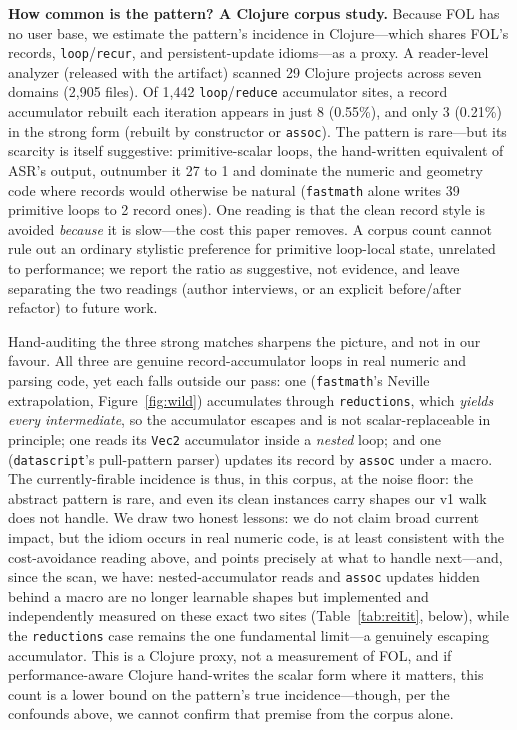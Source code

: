 \documentclass[sigplan,screen,review,anonymous]{acmart}
\begin{document}
\textbf{How common is the pattern? A Clojure corpus study.} Because FOL has no
user base, we estimate the pattern's incidence in Clojure---which shares FOL's
records, \texttt{loop}/\texttt{recur}, and persistent-update idioms---as a proxy.
A reader-level analyzer (released with the artifact) scanned 29 Clojure projects
across seven domains (2{,}905 files). Of 1{,}442 \texttt{loop}/\texttt{reduce}
accumulator sites, a record accumulator rebuilt each iteration appears in just 8
(0.55\%), and only 3 (0.21\%) in the strong form (rebuilt by constructor or
\texttt{assoc}). The pattern is rare---but its scarcity is itself suggestive:
primitive-scalar loops, the hand-written equivalent of ASR's output, outnumber it
27 to 1 and dominate the numeric and geometry code where records would
otherwise be natural (\texttt{fastmath} alone writes 39 primitive loops to 2
record ones). One reading is that the clean record style is avoided
\emph{because} it is slow---the cost this paper removes. A corpus count
cannot rule out an ordinary stylistic preference for primitive
loop-local state, unrelated to performance; we report the ratio as
suggestive, not evidence, and leave separating the two readings (author
interviews, or an explicit before/after refactor) to future work.

Hand-auditing the three strong matches sharpens the picture, and not in our
favour. All three are genuine record-accumulator loops in
real numeric and parsing code, yet each falls outside our pass: one
(\texttt{fastmath}'s Neville extrapolation, Figure~\ref{fig:wild}) accumulates through
\texttt{reductions}, which \emph{yields every intermediate}, so the accumulator
escapes and is not scalar-replaceable in principle; one reads its
\texttt{Vec2} accumulator inside a \emph{nested} loop; and one
(\texttt{datascript}'s pull-pattern parser) updates its record by \texttt{assoc}
under a macro. The currently-firable incidence is thus, in this corpus, at the
noise floor: the abstract pattern is rare, and even its clean instances carry
shapes our v1 walk does not handle. We draw two honest lessons: we do not
claim broad current impact, but the idiom occurs in real numeric
code, is at least consistent with the cost-avoidance reading above, and
points precisely at what to handle next---and, since the scan, we have:
nested-accumulator reads and \texttt{assoc} updates hidden behind a macro
are no longer learnable shapes but implemented and independently
measured on these exact two sites (Table~\ref{tab:reitit}, below), while
the \texttt{reductions} case remains the one fundamental limit---a
genuinely escaping accumulator. This is a Clojure proxy, not a measurement of FOL, and if
performance-aware Clojure hand-writes the scalar form where it matters,
this count is a lower bound on the pattern's true incidence---though, per
the confounds above, we cannot confirm that premise from the corpus alone.
\end{document}
